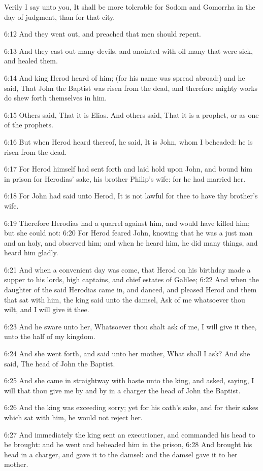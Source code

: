 Verily I say unto you, It shall be more tolerable for Sodom and
Gomorrha in the day of judgment, than for that city.

6:12 And they went out, and preached that men should repent.

6:13 And they cast out many devils, and anointed with oil many that
were sick, and healed them.

6:14 And king Herod heard of him; (for his name was spread abroad:)
and he said, That John the Baptist was risen from the dead, and
therefore mighty works do shew forth themselves in him.

6:15 Others said, That it is Elias. And others said, That it is a
prophet, or as one of the prophets.

6:16 But when Herod heard thereof, he said, It is John, whom I
beheaded: he is risen from the dead.

6:17 For Herod himself had sent forth and laid hold upon John, and
bound him in prison for Herodias' sake, his brother Philip's wife: for
he had married her.

6:18 For John had said unto Herod, It is not lawful for thee to have
thy brother's wife.

6:19 Therefore Herodias had a quarrel against him, and would have
killed him; but she could not: 6:20 For Herod feared John, knowing
that he was a just man and an holy, and observed him; and when he
heard him, he did many things, and heard him gladly.

6:21 And when a convenient day was come, that Herod on his birthday
made a supper to his lords, high captains, and chief estates of
Galilee; 6:22 And when the daughter of the said Herodias came in, and
danced, and pleased Herod and them that sat with him, the king said
unto the damsel, Ask of me whatsoever thou wilt, and I will give it
thee.

6:23 And he sware unto her, Whatsoever thou shalt ask of me, I will
give it thee, unto the half of my kingdom.

6:24 And she went forth, and said unto her mother, What shall I ask?
And she said, The head of John the Baptist.

6:25 And she came in straightway with haste unto the king, and asked,
saying, I will that thou give me by and by in a charger the head of
John the Baptist.

6:26 And the king was exceeding sorry; yet for his oath's sake, and
for their sakes which sat with him, he would not reject her.

6:27 And immediately the king sent an executioner, and commanded his
head to be brought: and he went and beheaded him in the prison, 6:28
And brought his head in a charger, and gave it to the damsel: and the
damsel gave it to her mother.


